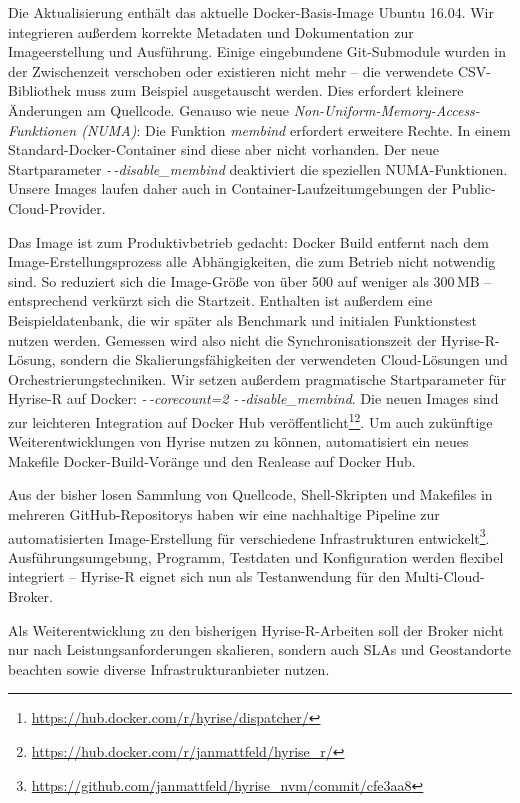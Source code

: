 Die Aktualisierung enthält das aktuelle Docker-Basis-Image Ubuntu 16.04. Wir integrieren außerdem korrekte Metadaten und Dokumentation zur Imageerstellung und Ausführung. Einige eingebundene Git-Submodule wurden in der Zwischenzeit verschoben oder existieren nicht mehr -- die verwendete CSV-Bibliothek muss zum Beispiel ausgetauscht werden. Dies erfordert kleinere Änderungen am Quellcode. Genauso wie neue \emph{Non-Uniform-Memory-Access-Funktionen (NUMA)}: Die Funktion \emph{membind} erfordert erweitere Rechte. In einem Standard-Docker-Container sind diese aber nicht vorhanden. Der neue Startparameter \mbox{\emph{-\,-disable\_membind}} deaktiviert die speziellen NUMA-Funktionen. Unsere Images laufen daher auch in Container-Laufzeitumgebungen der Public-Cloud-Provider.

Das Image ist zum Produktivbetrieb gedacht: Docker Build entfernt nach dem Image-Erstellungsprozess alle Abhängigkeiten, die zum Betrieb nicht notwendig sind. So reduziert sich die Image-Größe von über 500 auf weniger als 300\,MB -- entsprechend verkürzt sich die Startzeit. Enthalten ist außerdem eine Beispieldatenbank, die wir später als Benchmark und initialen Funktionstest nutzen werden. Gemessen wird also nicht die Synchronisationszeit der Hyrise-R-Lösung, sondern die Skalierungsfähigkeiten der verwendeten Cloud-Lösungen und Orchestrierungstechniken. Wir setzen außerdem pragmatische Startparameter für Hyrise-R auf Docker: \emph{-\,-corecount=2} \emph{-\,-disable\_membind}. Die neuen Images sind zur leichteren Integration auf Docker Hub veröffentlicht\footnote{\url{https://hub.docker.com/r/hyrise/dispatcher/}}\footnote{\url{https://hub.docker.com/r/janmattfeld/hyrise_r/}}. Um auch zukünftige Weiterentwicklungen von Hyrise nutzen zu können, automatisiert ein neues Makefile Docker-Build-Voränge und den Realease auf Docker Hub.

Aus der bisher losen Sammlung von Quellcode, Shell-Skripten und Makefiles in mehreren GitHub-Repositorys haben wir eine nachhaltige Pipeline zur automatisierten Image-Erstellung für verschiedene Infrastrukturen entwickelt\footnote{\url{https://github.com/janmattfeld/hyrise_nvm/commit/cfe3aa8}}. Ausführungsumgebung, Programm, Testdaten und Konfiguration werden flexibel integriert -- Hyrise-R eignet sich nun als Testanwendung für den Multi-Cloud-Broker.

Als Weiterentwicklung zu den bisherigen Hyrise-R-Arbeiten soll der Broker nicht nur nach Leistungsanforderungen skalieren, sondern auch SLAs und Geostandorte beachten sowie diverse Infrastrukturanbieter nutzen.


